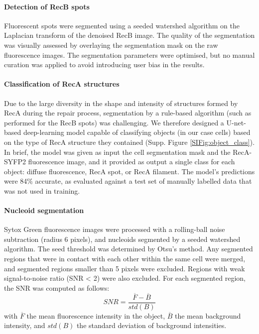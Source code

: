 \paragraph*{Detection of RecB spots}
Fluorescent spots were seg\-men\-ted using a seeded watershed algorithm on the Laplacian transform of the denoised RecB image. The quality of the segmentation was visually assessed by overlaying the segmentation mask on the raw fluorescence images. The segmentation parameters were optimised, but no manual curation was applied to avoid introducing user bias in the results.

\paragraph*{Classification of RecA structures}
Due to the large diversity in the shape and intensity of structures formed by RecA during the repair process, segmentation by a rule-based algorithm (such as performed for the RecB spots) was challenging. We therefore designed a U-net-based deep-learning model capable of classifying objects (in our case cells) based on the type of RecA structure they contained (Supp. Figure \ref{SIFig:object_class}). In brief, the model was given as input the cell segmentation mask and the RecA-SYFP2 fluorescence image, and it provided as output a single class for each object: diffuse fluorescence, RecA spot, or RecA filament. The model's predictions were 84\% accurate, as evaluated against a test set of manually labelled data that was not used in training.

\paragraph*{Nucleoid segmentation}
Sytox Green fluorescence images were processed with a rolling-ball noise subtraction (radius 6 pixels), and nucleoids segmented by a seeded watershed algorithm. The seed threshold was determined by Otsu's method\cite{Otsu1979}. Any segmented regions that were in contact with each other within the same cell were merged, and segmented regions smaller than 5 pixels were excluded. Regions with weak signal-to-noise ratio (SNR < 2) were also excluded. For each segmented region, the SNR was computed as follows:
\begin{equation}
    SNR = \dfrac{\overline{F}-\overline{B}}{std(B)}
\end{equation}
with $\overline{F}$ the mean fluorescence intensity in the object, $\overline{B}$ the mean background intensity, and $std(B)$ the standard deviation of background intensities.

